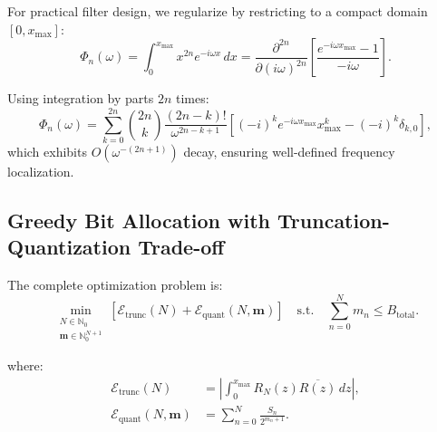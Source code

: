 For practical filter design, we regularize by restricting to a compact domain $[0, x_{\max}]$:
\[
\Phi_n(\omega) = \int_0^{x_{\max}} x^{2n} e^{-i\omega x} \, dx = \frac{\partial^{2n}}{\partial (i\omega)^{2n}} \left[\frac{e^{-i\omega x_{\max}} - 1}{-i\omega}\right].
\]

Using integration by parts $2n$ times:
\[
\Phi_n(\omega) = \sum_{k=0}^{2n} \binom{2n}{k} \frac{(2n-k)!}{\omega^{2n-k+1}} \left[(-i)^k e^{-i\omega x_{\max}} x_{\max}^k - (-i)^k \delta_{k,0}\right],
\]
which exhibits $O(\omega^{-(2n+1)})$ decay, ensuring well-defined frequency localization.

\subsection{Greedy Bit Allocation with Truncation-Quantization Trade-off}

The complete optimization problem is:
\begin{equation}
\min_{\substack{N \in \mathbb{N}_0 \\ \mathbf{m} \in \mathbb{N}_0^{N+1}}} \left[\mathcal{E}_{\text{trunc}}(N) + \mathcal{E}_{\text{quant}}(N, \mathbf{m})\right] \quad \text{s.t.} \quad \sum_{n=0}^{N} m_n \leq B_{\text{total}}.
\tag{P}
\label{eq:full_optimization}
\end{equation}

where:
\begin{align*}
\mathcal{E}_{\text{trunc}}(N) &= \left|\int_0^{x_{\max}} R_N(z) \overline{R(z)} \, dz\right|, \\
\mathcal{E}_{\text{quant}}(N, \mathbf{m}) &= \sum_{n=0}^{N} \frac{S_n}{2^{m_n+1}}.
\end{align*}

